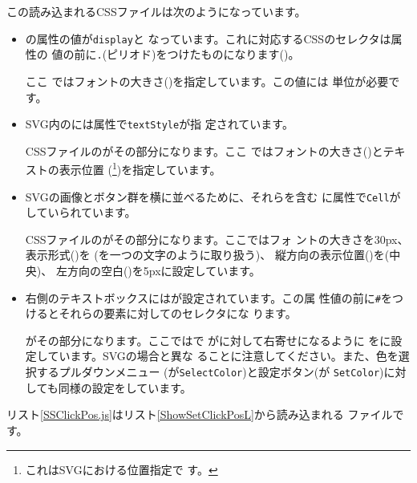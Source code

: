 この読み込まれるCSSファイルは次のようになっています。
\begin{itemize}
 \item {}の属性の値が\texttt{display}と
       なっています。これに対応するCSSのセレクタは属性の
       値の前に\texttt{.}(ピリオド)をつけたものになります()。

       ここ
       ではフォントの大きさ()を指定しています。この値には
       単位が必要です。
 \item SVG内のには属性で\texttt{textStyle}が指
       定されています。

       CSSファイルのがその部分になります。ここ
       ではフォントの大きさ()とテキストの表示位置
       (\footnote{これはSVGにおける位置指定で
       す。})を指定しています。
 \item SVGの画像とボタン群を横に並べるために、それらを含む
       に属性で\texttt{Cell}がしていられています。

       CSSファイルのがその部分になります。ここではフォ
       ントの大きさを30px、表示形式()を
       (を一つの文字のように取り扱う)、
       縦方向の表示位置()を(中央)、
       左方向の空白()を5pxに設定しています。
 \item 右側のテキストボックスにはが設定されています。この属
       性値の前に\texttt{\#}をつけるとそれらの要素に対してのセレクタにな
       ります。

       がその部分になります。ここではで
       がに対して右寄せになるように
       をに設定しています。SVGの場合と異な
       ることに注意してください。また、色を選択するプルダウンメニュー
       (が\texttt{SelectColor})と設定ボタン(が
       \texttt{SetColor})に対しても同様の設定をしています。
\end{itemize}
リスト\ref{SSClickPos.js}はリスト\ref{ShowSetClickPosL}から読み込まれる
\JS ファイルです。
